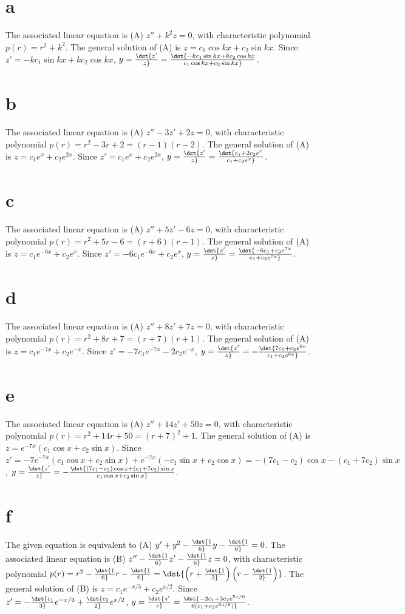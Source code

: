 \documentclass[dvips]{book}
\renewcommand{\exer}[1]{\par\medskip\;\noindent{\color{red}\bf #1.}}
\numberwithin{example}{section}
\numberwithin{equation}{section}
\numberwithin{theorem}{section}
\numberwithin{table}{section}
\numberwithin{figure}{section}
\begin{document}
\exer{5.6.38}
\part{a} The associated linear equation is (A) $z''+k^2z=0$, with
characteristic polynomial $p(r)=r^2+k^2$. The general solution of (A)
is $z=c_1\cos kx+c_2\sin kx$. Since $z'=-kc_1\sin kx+kc_2\cos kx$,
$y=\dst{z'\over z}=\dst{-kc_1\sin kx+kc_2\cos kx\over c_1 \cos
kx+c_2\sin kx}$.

\part{b} The associated linear equation is (A) $z''-3z'+2z=0$, with
characteristic polynomial $p(r)=r^2-3r+2=(r-1)(r-2)$. The general
solution of (A) is $z=c_1e^x+c_2e^{2x}$. Since $z'=c_1e^x+c_2e^{2x}$,
$y=\dst{z'\over z}=\dst{c_1+2c_2e^x\over c_1+c_2e^x}$.

\part{c} The associated linear equation is (A) $z''+5z'-6z=0$, with
characteristic polynomial $p(r)=r^2+5r-6=(r+6)(r-1)$. The general
solution of (A) is $z=c_1e^{-6x}+c_2e^x$. Since
$z'=-6c_1e^{-6x}+c_2e^x$, $y=\dst{z'\over z}=\dst{-6c_1+c_2e^{7x}\over
c_1+c_2e^{7x}}$.

\part{d} The associated linear equation is (A) $z''+8z'+7z=0$, with
characteristic polynomial $p(r)=r^2+8r+7=(r+7)(r+1)$. The general
solution of (A) is $z=c_1e^{-7x}+c_2e^{-x}$. Since
$z'=-7c_1e^{-7x}-2c_2e^{-x}$, $y=\dst{z'\over
z}=-\dst{7c_1+c_2e^{6x}\over c_1+c_2e^{6x}}$.

\part{e} The associated linear equation is (A) $z''+14z'+50z=0$, with
characteristic polynomial $p(r)=r^2+14r+50=(r+7)^2+1$. The general
solution of (A) is $z=e^{-7x}(c_1\cos x+c_2\sin x)$. Since
$z'=-7e^{-7x}(c_1\cos x+c_2\sin x)+ e^{-7x}(-c_1\sin x+c_2\cos
x)=-(7c_1-c_2)\cos x-(c_1+7c_2)\sin x$, $y=\dst{z'\over
z}=-\dst{(7c_1-c_2)\cos x+(c_1+7c_2)\sin x\over c_1\cos x+c_2\sin x}$.

\part{f} The given equation is equivalent to (A)
$y'+y^2-\dst{1\over6}y-\dst{1\over6}=0$. The associated linear
equation is (B) $z''-\dst{1\over6}z'-\dst{1\over6}z=0$, with
characteristic polynomial
$p(r)=r^2-\dst{1\over6}r-\dst{1\over6}=\dst{\left(r+\dst{1\over3}\right)
\left(r-\dst{1\over2}\right)}$. The general solution of (B) is
$z=c_1e^{-x/3}+c_2e^{x/2}$. Since
$z'=-\dst{c_1\over3}e^{-x/3}+\dst{c_2\over2}e^{x/2}$, $y=\dst{z'\over
z} =\dst{-2c_1+3c_2e^{5x/6}\over 6(c_1+c_2e^{5x/6})}$.
\end{document}
